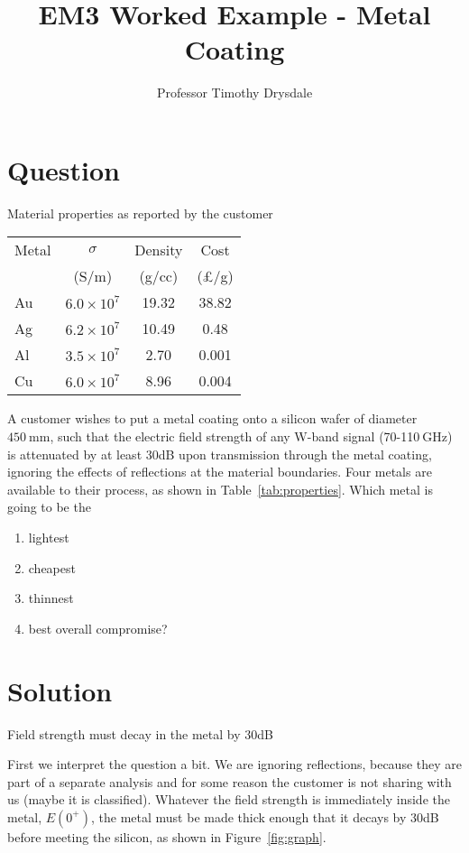 \documentclass{tufte-handout}
\title{EM3 Worked Example - Metal Coating}
\author{Professor Timothy Drysdale}
\begin{document}
\maketitle

\section{Question}
\begin{margintable}
\caption{Material properties as reported by the customer}
\centering
\begin{tabular}{|l|c|c|c|}
\hline 
Metal & $\sigma$ & Density & Cost \\
          & (S/m) & (g/cc) & (£/g) \\
\hline
Au & $6.0\times10^7$ & 19.32 & 38.82 \\
Ag & $6.2\times10^7$ & 10.49 & 0.48 \\
Al & $3.5\times10^7$ & 2.70 & 0.001 \\
Cu & $6.0\times10^7$ & 8.96 & 0.004 \\
\hline
\end{tabular}
\label{tab:properties}
\end{margintable}

A customer wishes to put a metal coating onto a silicon wafer of diameter $\SI{450}{\milli\metre}$, such that the electric field strength of any W-band signal (70-110$\SI{}{\giga\hertz}$) is attenuated by at least 30dB upon transmission through the metal coating, ignoring the effects of reflections at the material boundaries. Four metals are available to their process, as shown in Table~\ref{tab:properties}. Which metal is going to be the 
\begin{enumerate}
\item lightest
\item cheapest
\item thinnest
\item best overall compromise?
\end{enumerate}

\section{Solution}
\begin{marginfigure}

\caption{Field strength must decay in the metal by 30dB}
\label{fig:graph}
\end{marginfigure}

First we interpret the question a bit. We are ignoring reflections, because they are part of a separate analysis and for some reason the customer is not sharing with us (maybe it is classified). Whatever the field strength is immediately inside the metal, $E(0^+)$, the metal must be made thick enough that it decays by 30dB before meeting the silicon, as shown in Figure~\ref{fig:graph}. 
\end{document}
